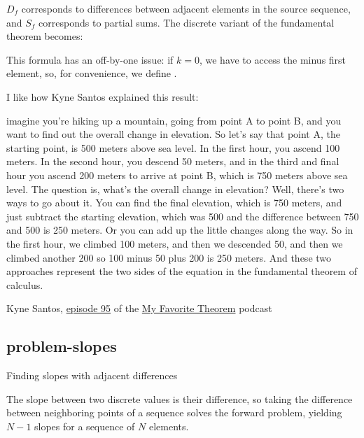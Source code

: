 \documentclass{article}
\begin{document}
$D_f$ corresponds to differences between adjacent elements in the source sequence,
and $S_f$ corresponds to partial sums.
The discrete variant of the fundamental theorem becomes:


\label{off-by-one}
This formula has an off-by-one issue:
if $k = 0$,
we have to access the minus first element, so, for convenience,
we define .

I like how Kyne Santos explained this result:

\epigraph{
imagine you're hiking up a mountain, going from point A to point B, and you want to find out the overall change in elevation.
So let's say that point A, the starting point, is 500 meters above sea level.
In the first hour, you ascend 100 meters.
In the second hour, you descend 50 meters, and in the third and final hour you ascend 200 meters to arrive at point B, which is 750 meters above sea level.
The question is, what's the overall change in elevation? Well, there's two ways to go about it.
You can find the final elevation, which is 750 meters, and just subtract the starting elevation, which was 500 and the difference between 750 and 500 is 250 meters.
Or you can add up the little changes along the way.
So in the first hour, we climbed 100 meters, and then we descended 50, and then we climbed another 200 so 100 minus 50 plus 200 is 250 meters.
And these two approaches represent the two sides of the equation in the fundamental theorem of calculus.
}{Kyne Santos, \href{https://kpknudson.com/my-favorite-theorem/2025/5/15/episode-95-kyne-santos}{episode 95} of the \href{https://kpknudson.com/my-favorite-theorem}{My Favorite Theorem} podcast}

\subsection{problem-slopes}{Finding slopes with adjacent differences}

The slope between two discrete values is their difference,
so taking the difference between neighboring points of a sequence solves the forward problem,
yielding $N-1$ slopes for a sequence of $N$ elements.
\end{document}
